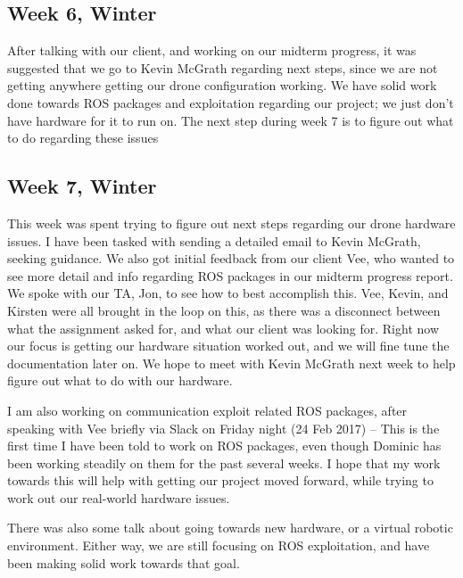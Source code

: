 \documentclass[IEEEtran,letterpaper,10pt,notitlepage,draftclsnofoot,onecolumn]{article}
\begin{document}
                            \subsection{Week 6, Winter}
                            After talking with our client, and working on our midterm progress, it was suggested that we go to Kevin McGrath regarding next steps, since we are not getting anywhere getting our drone configuration working. We have solid work done towards ROS packages and exploitation regarding our project; we just don't have hardware for it to run on. The next step during week 7 is to figure out what to do regarding these issues
                            \subsection{Week 7, Winter}
                            This week was spent trying to figure out next steps regarding our drone hardware issues. I have been tasked with sending a detailed email to Kevin McGrath, seeking guidance. We also got initial feedback from our client Vee, who wanted to see more detail and info regarding ROS packages in our midterm progress report. We spoke with our TA, Jon, to see how to best accomplish this. Vee, Kevin, and Kirsten were all brought in the loop on this, as there was a disconnect between what the assignment asked for, and what our client was looking for. Right now our focus is getting our hardware situation worked out, and we will fine tune the documentation later on. We hope to meet with Kevin McGrath next week to help figure out what to do with our hardware.

                            I am also working on communication exploit related ROS packages, after speaking with Vee briefly via Slack on Friday night (24 Feb 2017) -- This is the first time I have been told to work on ROS packages, even though Dominic has been working steadily on them for the past several weeks. I hope that my work towards this will help with getting our project moved forward, while trying to work out our real-world hardware issues.

                            There was also some talk about going towards new hardware, or a virtual robotic environment. Either way, we are still focusing on ROS exploitation, and have been making solid work towards that goal.
\end{document}

